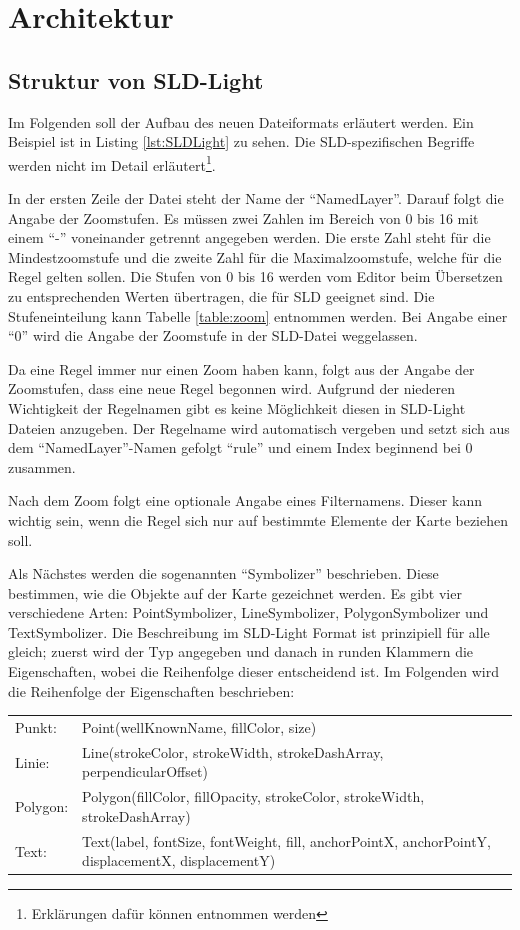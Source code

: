 \section{Architektur}\label{Architektur}
\subsection{Struktur von SLD-Light}\label{SLD-Light}
Im Folgenden soll der Aufbau des neuen Dateiformats erläutert werden. Ein Beispiel ist in Listing \ref{lst:SLDLight} zu sehen. Die SLD-spezifischen Begriffe werden nicht im Detail erläutert\footnote{Erklärungen dafür können \cite{GeoServer_Doc} entnommen werden}. 

In der ersten Zeile der Datei steht der Name der \enquote{NamedLayer}. Darauf folgt die Angabe der Zoomstufen. Es müssen zwei Zahlen im Bereich von 0 bis 16 mit einem \enquote{-} voneinander getrennt angegeben werden. Die erste Zahl steht für die Mindestzoomstufe und die zweite Zahl für die Maximalzoomstufe, welche für die Regel gelten sollen. Die Stufen von 0 bis 16 werden vom Editor beim Übersetzen zu entsprechenden Werten übertragen, die für SLD geeignet sind. Die Stufeneinteilung kann Tabelle \ref{table:zoom} entnommen werden. Bei Angabe einer \enquote{0} wird die Angabe der Zoomstufe in der SLD-Datei weggelassen. 

Da eine Regel immer nur einen Zoom haben kann, folgt aus der Angabe der Zoomstufen, dass eine neue Regel begonnen wird. Aufgrund der niederen Wichtigkeit der Regelnamen gibt es keine Möglichkeit diesen in SLD-Light Dateien anzugeben. Der Regelname wird automatisch vergeben und setzt sich aus dem \enquote{NamedLayer}-Namen gefolgt \enquote{\textunderscore rule\textunderscore} und einem Index beginnend bei 0 zusammen.

Nach dem Zoom folgt eine optionale Angabe eines Filternamens. Dieser kann wichtig sein, wenn die Regel sich nur auf bestimmte Elemente der Karte beziehen soll.

Als Nächstes werden die sogenannten \enquote{Symbolizer} beschrieben. Diese bestimmen, wie die Objekte auf der Karte gezeichnet werden. Es gibt vier verschiedene Arten: PointSymbolizer, LineSymbolizer, PolygonSymbolizer und TextSymbolizer. Die Beschreibung im SLD-Light Format ist prinzipiell für alle gleich; zuerst wird der Typ angegeben und danach in runden Klammern die Eigenschaften, wobei die Reihenfolge dieser entscheidend ist. Im Folgenden wird die Reihenfolge der Eigenschaften beschrieben:

\begin{tabular}{l p{12cm}}
Punkt: & Point(wellKnownName, fillColor, size) \\

Linie: & Line(strokeColor, strokeWidth, strokeDashArray, perpendicularOffset) \\

Polygon: & Polygon(fillColor, fillOpacity, strokeColor, strokeWidth, strokeDashArray) \\

Text: & Text(label, fontSize, fontWeight, fill, anchorPointX, anchorPointY, displacementX, displacementY) \\
\end{tabular}

